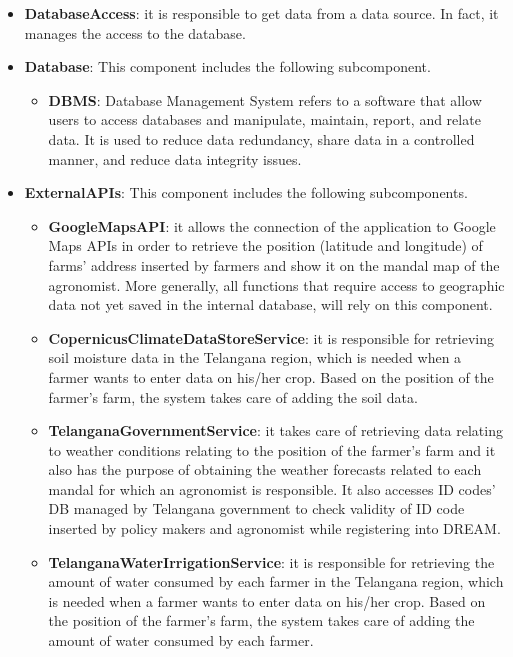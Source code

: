 \begin{itemize}
\item \textbf{DatabaseAccess}: it is responsible to get data from a data source. In fact, it manages the access to the database.

\item \textbf{Database}: This component includes the following subcomponent.

\begin{itemize}
    \item \textbf{DBMS}: Database Management System refers to a software that allow users to access databases and manipulate, maintain, report, and relate data. It is used to reduce data redundancy, share data in a controlled manner, and reduce data integrity issues.
\end{itemize}

\item \textbf{ExternalAPIs}: This component includes the following subcomponents.

\begin{itemize}
    \item \textbf{GoogleMapsAPI}: it allows the connection of the application to Google Maps APIs in order to retrieve the position (latitude and longitude) of farms’ address inserted by farmers and show it on the mandal map of the agronomist. More generally, all functions that require access to geographic data not yet saved in the internal database, will rely on this component.
    \item \textbf{CopernicusClimateDataStoreService}: it is responsible for retrieving soil moisture data in the Telangana region, which is needed when a farmer wants to enter data on his/her crop. Based on the position of the farmer's farm, the system takes care of adding the soil data.
    \item \textbf{TelanganaGovernmentService}: it takes care of retrieving data relating to weather conditions relating to the position of the farmer's farm and it also has the purpose of obtaining the weather forecasts related to each mandal for which an agronomist is responsible. It also accesses ID codes' DB managed by Telangana government to check validity of ID code inserted by policy makers and agronomist while registering into DREAM. 
    \item \textbf{TelanganaWaterIrrigationService}: it is responsible for retrieving the amount of water consumed by each farmer in the Telangana region, which is needed when a farmer wants to enter data on his/her crop. Based on the position of the farmer's farm, the system takes care of adding the amount of water consumed by each farmer.
\end{itemize}

\end{itemize}


\def\fillandplacepagenumber{%
 \par\pagestyle{empty}%
\vbox to 0pt{\vss}\vfill
\vbox to 0pt{\baselineskip0pt
   \hbox to\linewidth{\hss}%
   \setlength{\footskip}{70pt}
   \baselineskip\footskip
   \hbox to\linewidth{%
     \hfil\thepage\hfil}\vss}}




